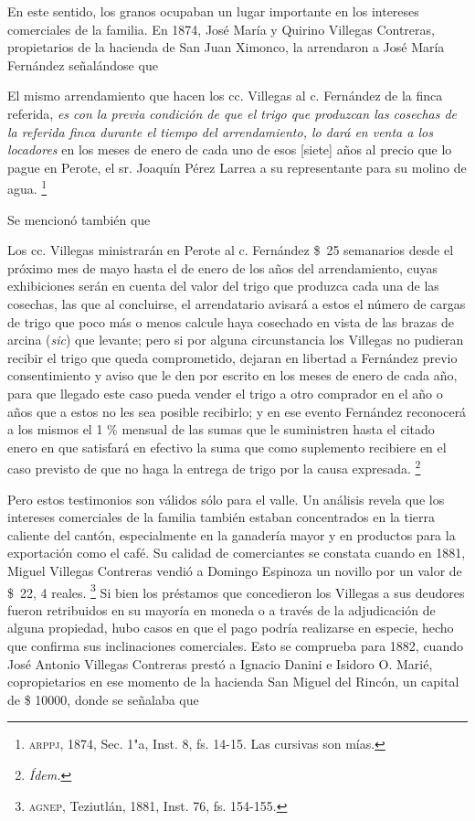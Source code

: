 \documentclass[14pt,twoside,final]{extbook} %
\let\oldfootnote\footnote
\renewcommand\footnote[1]{%
\oldfootnote{\hspace{1mm}#1}}
\begin{document}
En este sentido, los granos ocupaban un lugar importante en los intereses comerciales de la familia. En 1874, José María y Quirino Villegas Contreras, propietarios de la hacienda de San Juan Ximonco, la arrendaron a José María Fernández señalándose que 
\begin{quoting}
El mismo arrendamiento que hacen los cc. Villegas al c. Fernández de la finca referida, \emph{es con la previa condición de que el trigo que produzcan las cosechas de la referida finca durante el tiempo del arrendamiento, lo dará en venta a los locadores} en los meses de enero de cada uno de esos [siete] años al precio que lo pague en Perote, el sr. Joaquín Pérez Larrea a su representante para su molino de agua.\footnote{\textsc{arppj}, 1874, Sec. 1"a, Inst. 8, fs. 14-15. Las cursivas son mías.} 
\end{quoting}
Se mencionó también que 
\begin{quoting}
Los cc. Villegas ministrarán en Perote al c. Fernández \$~25 semanarios desde el próximo mes de mayo hasta el de enero de los años del arrendamiento, cuyas exhibiciones serán en cuenta del valor del trigo que produzca cada una de las cosechas, las que al concluirse, el arrendatario avisará a estos el número de cargas de trigo que poco más o menos calcule haya cosechado en vista de las brazas de arcina (\emph{sic}) que levante; pero si por alguna circunstancia los Villegas no pudieran recibir el trigo que queda comprometido, dejaran en libertad a Fernández previo consentimiento y aviso que le den por escrito en los meses de enero de cada año, para que llegado este caso pueda vender el trigo a otro comprador en el año o años que a estos no les sea posible recibirlo; y en ese evento Fernández reconocerá a los mismos el 1 \% mensual de las sumas que le suministren hasta el citado enero en que satisfará en efectivo la suma que como suplemento recibiere en el caso previsto de que no haga la entrega de trigo por la causa expresada.\footnote{\em Ídem.}
\end{quoting}
Pero estos testimonios son válidos sólo para el valle. Un análisis revela que los intereses comerciales de la familia también estaban concentrados en la tierra caliente del cantón, especialmente en la ganadería mayor y en productos para la exportación como el café. Su calidad de comerciantes se constata cuando en 1881, Miguel Villegas Contreras vendió a Domingo Espinoza un novillo por un valor de \$~22, 4 reales.\footnote{\textsc{agnep}, Teziutlán, 1881, Inst. 76, fs. 154-155.} Si bien los préstamos que concedieron los Villegas a sus deudores fueron retribuidos en su mayoría en moneda o a través de la adjudicación de alguna propiedad, hubo casos en que el pago podría realizarse en especie, hecho que confirma sus inclinaciones comerciales. Esto se comprueba para 1882, cuando José Antonio Villegas Contreras prestó a Ignacio Danini e Isidoro O. Marié, copropietarios en ese momento de la hacienda San Miguel del Rincón, un capital de \$ 10000, donde se señalaba que
\end{document}
